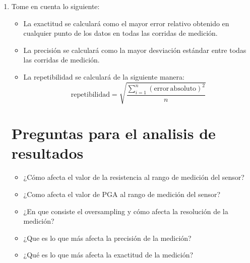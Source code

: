 \begin{enumerate}
    \item Tome en cuenta lo siguiente:
        \begin{itemize}
            \item La exactitud se calculará como el mayor error relativo obtenido en cualquier punto de los datos en todas las corridas de medición.
            \item La precisión se calculará como la mayor desviación estándar entre todas las corridas de medición.
            \item La repetibilidad se calculará de la siguiente manera:
            \begin{equation*}
                \mathrm{repetibilidad} = \sqrt{\dfrac{\sum_{i=1}^n(\mathrm{error\,absoluto})^2}{n}}
            \end{equation*}
        \end{itemize}


    \section{Preguntas para el analisis de resultados}
    \begin{itemize}
        \item ¿Cómo afecta el valor de la resistencia al rango de medición del sensor?
        \item ¿Como afecta el valor de PGA al rango de medición del sensor? 
        \item ¿En que consiste el oversampling y cómo afecta la resolución de la medición?
        \item ¿Que es lo que más afecta la precisión de la medición?
        \item ¿Qué es lo que más afecta la exactitud de la medición?
    \end{itemize}


\end{enumerate}
